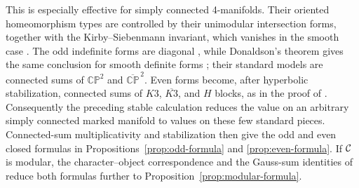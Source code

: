 This is especially effective for simply connected 4-manifolds.  Their
oriented homeomorphism types are controlled by their unimodular intersection
forms, together with the Kirby--Siebenmann invariant, which vanishes in the
smooth case \cite{Freedman1982}.  The odd indefinite forms are diagonal
\cite[Theorem~2.3.1]{PetersSterk2024}, while Donaldson's theorem gives the same
conclusion for smooth definite forms \cite[Theorem~A]{Donaldson1983}; their
standard models are connected sums of $\mathbb{CP}^2$ and
$\overline{\mathbb{CP}}^{\,2}$.  Even forms become, after hyperbolic
stabilization, connected sums of $K3$, $\overline{K3}$, and $H$ blocks, as in
the proof of \cite[Corollary~3.9]{Reutter2023}.  Consequently the preceding
stable calculation reduces the value on an arbitrary simply connected marked
manifold to values on these few standard pieces.  Connected-sum
multiplicativity and stabilization then give the odd and even closed formulas
in Propositions~\ref{prop:odd-formula} and
\ref{prop:even-formula}.  If $\mathcal{C}$ is modular, the character--object
correspondence and the Gauss-sum identities of
\cite[Lemmas~8.15.3 and~8.22.9, Corollary~8.15.5, and
Proposition~8.15.4]{EGNO2015} reduce both formulas further to
Proposition~\ref{prop:modular-formula}.
